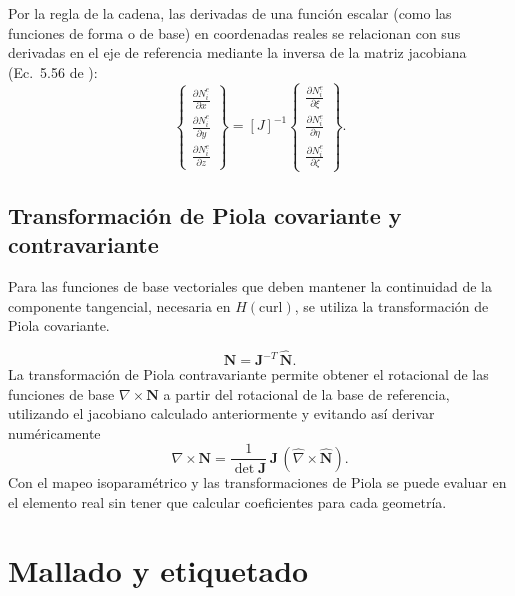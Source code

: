 \documentclass[12pt]{report} %
\begin{document}
Por la regla de la cadena, las derivadas de una función escalar (como las
funciones de forma o de base) en coordenadas reales se relacionan
con sus derivadas en el eje de referencia mediante la inversa
de la matriz jacobiana (Ec.~5.56 de \cite{jin2015}):
\begin{equation}\label{eq:derivadas-forma}
 \begin{Bmatrix}
 	\frac{\partial N_i^e}{\partial x} \\[2pt]
 	\frac{\partial N_i^e}{\partial y} \\[2pt]
 	\frac{\partial N_i^e}{\partial z}
 \end{Bmatrix}
 = [J]^{-1}
 \begin{Bmatrix}
 	\frac{\partial N_i^e}{\partial \xi} \\[2pt]
 	\frac{\partial N_i^e}{\partial \eta} \\[2pt]
 	\frac{\partial N_i^e}{\partial \zeta}
 \end{Bmatrix}.
\end{equation}


\subsection{Transformación de Piola covariante y contravariante}\label{sec:piola}
Para las funciones de base vectoriales que deben mantener la continuidad de la componente tangencial, necesaria en $H(\mathrm{curl})$, se utiliza la transformación de Piola covariante.

\begin{equation}\label{eq:piola-cov}
	\mathbf{N} = \mathbf{J}^{-T}\, \hat{\mathbf{N}} .
\end{equation}
La transformación de Piola contravariante permite obtener el rotacional de las funciones de base $\nabla\times\mathbf{N}$ a partir del rotacional de la base
de referencia, utilizando el jacobiano calculado anteriormente y evitando así derivar numéricamente
\begin{equation}\label{eq:piola-contra}
	\nabla\times\mathbf{N} = \frac{1}{\det \mathbf{J}}\, \mathbf{J}\,
	(\hat{\nabla}\times\hat{\mathbf{N}}) .
\end{equation}
Con el mapeo isoparamétrico y las transformaciones de Piola se puede evaluar en el elemento real sin tener que calcular coeficientes para cada geometría.

\section{Mallado y etiquetado}\label{sec:mallado}
\end{document}
